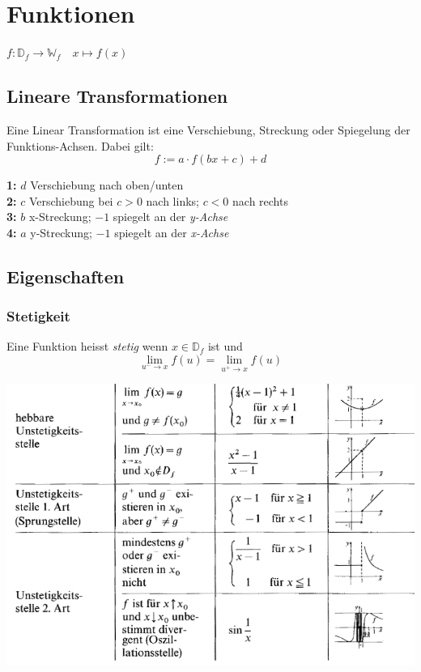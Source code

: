 \textbf{}
\section{Funktionen}
$ f:  \mathbb{D}_f \to \mathbb{W}_f \quad x \mapsto f(x) $

\subsection{Lineare Transformationen}
Eine Linear Transformation ist eine Verschiebung, Streckung oder Spiegelung der Funktions-Achsen. Dabei gilt:
\[ f := a \cdot f(bx + c) + d \]

\noindent \textbf{1:} $d$ Verschiebung nach oben/unten \\
\textbf{2:} $c$ Verschiebung bei $c>0$ nach links; $c<0$ nach rechts \\
\textbf{3:} $b$ x-Streckung; $-1$ spiegelt an der\textit{ y-Achse} \\
\textbf{4:} $a$ y-Streckung; $-1$ spiegelt an der \textit{x-Achse }\\

\subsection{Eigenschaften}
\subsubsection{Stetigkeit}
Eine Funktion heisst \textit{stetig} wenn $x \in \mathbb{D}_f$ ist und \[\lim\limits_{u^- \rightarrow x}f(u) = \lim\limits_{u^+ \rightarrow x}f(u)\]

\noindent\includegraphics[width=\columnwidth]{./Images/unstetigkeit.png}

